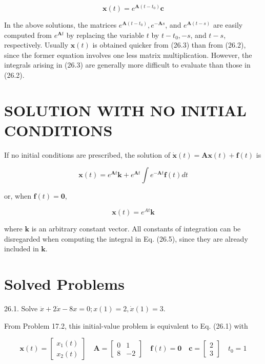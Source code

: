 \documentclass[10pt]{article}
\begin{document}
\begin{equation*}
\mathbf{x}(t)=e^{\mathbf{A}\left(t-t_{0}\right)} \mathbf{c} \tag{26.4}
\end{equation*}


In the above solutions, the matrices $e^{\mathbf{A}\left(t-t_{0}\right)}, e^{-\mathbf{A} s}$, and $e^{\mathbf{A}(t-s)}$ are easily computed from $e^{\mathbf{A} t}$ by replacing the variable $t$ by $t-t_{0},-s$, and $t-s$, respectively. Usually $\mathbf{x}(t)$ is obtained quicker from (26.3) than from (26.2),\\
since the former equation involves one less matrix multiplication. However, the integrals arising in (26.3) are generally more difficult to evaluate than those in (26.2).

\section*{SOLUTION WITH NO INITIAL CONDITIONS}
If no initial conditions are prescribed, the solution of $\dot{\mathbf{x}}(t)=\mathbf{A x}(t)+\mathbf{f}(t)$ is


\begin{equation*}
\mathbf{x}(t)=e^{\mathbf{A} t} \mathbf{k}+e^{\mathbf{A} t} \int e^{-\mathbf{A} t} \mathbf{f}(t) d t \tag{26.5}
\end{equation*}


or, when $\mathbf{f}(t)=\mathbf{0}$,


\begin{equation*}
\mathbf{x}(t)=e^{A t} \mathbf{k} \tag{26.6}
\end{equation*}


where $\mathbf{k}$ is an arbitrary constant vector. All constants of integration can be disregarded when computing the integral in Eq. (26.5), since they are already included in $\mathbf{k}$.

\section*{Solved Problems}
26.1. Solve $\ddot{x}+2 \dot{x}-8 x=0 ; x(1)=2, \dot{x}(1)=3$.

From Problem 17.2, this initial-value problem is equivalent to Eq. (26.1) with

$$
\mathbf{x}(t)=\left[\begin{array}{l}
x_{1}(t) \\
x_{2}(t)
\end{array}\right] \quad \mathbf{A}=\left[\begin{array}{rr}
0 & 1 \\
8 & -2
\end{array}\right] \quad \mathbf{f}(t)=\mathbf{0} \quad \mathbf{c}=\left[\begin{array}{l}
2 \\
3
\end{array}\right] \quad t_{0}=1
$$
\end{document}
